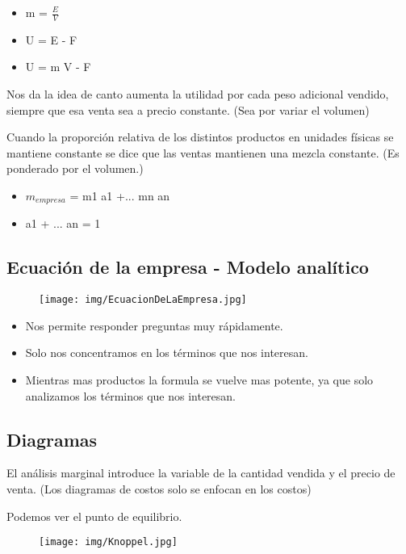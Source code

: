\documentclass[titlepage,a4paper]{article}
\begin{document}
\begin{itemize}
\item m = $\frac{E}{V}$
\item U = E - F
\item U = m V - F
\end{itemize}


Nos da la idea de canto aumenta la utilidad por cada peso adicional vendido, siempre que esa venta sea a precio constante. (Sea por variar el volumen)

Cuando la proporción relativa de los distintos productos en unidades físicas se mantiene constante se dice que las ventas mantienen una mezcla constante. (Es ponderado por el volumen.)

\begin{itemize}
\item $m_{empresa}$ = m1 a1 +... mn an
\item a1 + ... an = 1
\end{itemize}



\subsection*{Ecuación de la empresa - Modelo analítico}
\begin{figure}[!htb]
    \centering
    \texttt{[image: img/EcuacionDeLaEmpresa.jpg]}
\end{figure}

\begin{itemize}
\item Nos permite responder preguntas muy rápidamente.
\item Solo nos concentramos en los términos que nos interesan.
\item Mientras mas productos la formula se vuelve mas potente, ya que solo analizamos los términos que nos interesan.
\end{itemize}


\subsection*{Diagramas}
El análisis marginal introduce la variable de la cantidad vendida y el precio de venta. (Los diagramas de costos solo se enfocan en los costos)

Podemos ver el punto de equilibrio.

\begin{figure}[!htb]
    \centering
    \texttt{[image: img/Knoppel.jpg]}
\end{figure}
\end{document}
